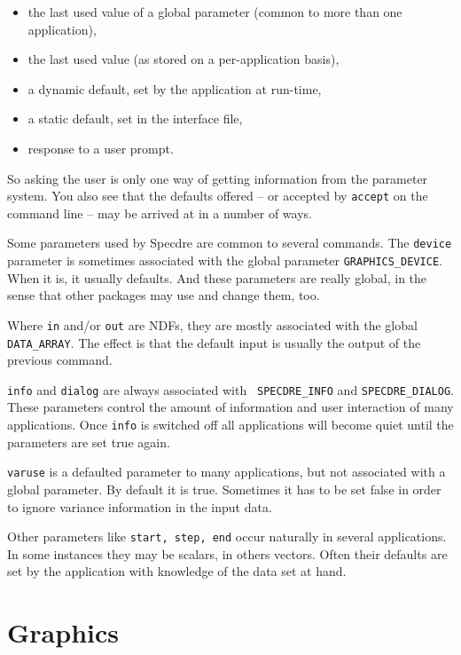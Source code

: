 \begin{itemize}
\item the last used value of a global parameter (common to more than one
   application),
\item the last used value (as stored on a per-application basis),
\item a dynamic default, set by the application at run-time,
\item a static default, set in the interface file,
\item response to a user prompt.
\end{itemize}

   So asking the user is only one way of getting information from the
   parameter system. You also see that the defaults offered -- or
   accepted by {\tt accept} on the command line -- may be arrived at in
   a number of ways.

   Some parameters used by Specdre are common to several commands. The
   {\tt device} parameter is sometimes associated with the global
   parameter {\tt GRAPHICS\_DEVICE}. When it is, it usually
   defaults. And these parameters are really global, in the sense that
   other packages may use and change them, too.

   Where {\tt in} and/or {\tt out} are NDFs, they are mostly associated
   with the global {\tt DATA\_ARRAY}. The effect is that the default
   input is usually the output of the previous command.

   {\tt info} and {\tt dialog} are always associated with {\tt
   SPECDRE\_INFO} and {\tt SPECDRE\_DIALOG}. These parameters control
   the amount of information and user interaction of many applications.
   Once {\tt info} is switched off all applications will become quiet
   until the parameters are set true again.

   {\tt varuse} is a defaulted parameter to many applications, but not
   associated with a global parameter. By default it is true. Sometimes
   it has to be set false in order to ignore variance information in the
   input data.

   Other parameters like {\tt start, step, end} occur naturally in
   several applications. In some instances they may be scalars, in
   others vectors. Often their defaults are set by the application with
   knowledge of the data set at hand.


\section{\label{graphic}Graphics}

